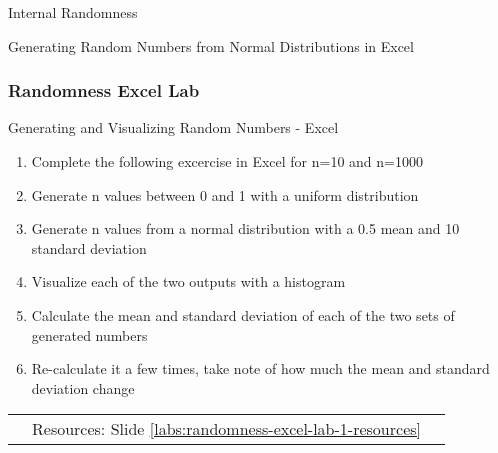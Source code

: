\documentclass[handout, 11pt]{beamer}
\begin{document}
\begin{section}{Internal Randomness}
\begin{frame}
{\begin{block}{Generating Random Numbers from Normal Distributions in Excel}
\end{block}
}
\end{frame}
\begin{frame}
\frametitle{Randomness Excel Lab}
{
\begin{block}{Generating and Visualizing Random Numbers - Excel}
\begin{enumerate}
\item Complete the following excercise in Excel for n=10 and n=1000
\item Generate n values between 0 and 1 with a uniform distribution
\item Generate n values from a normal distribution with a 0.5 mean and 10 standard deviation
\item Visualize each of the two outputs with a histogram
\item Calculate the mean and standard deviation of each of the two sets of generated numbers
\item Re-calculate it a few times, take note of how much the mean and standard deviation change
\end{enumerate}
\vfill
\begin{tabular*}{\textwidth}{@{\extracolsep{\fill}}ccc}
\toprule
\hfill & Resources: Slide \textcolor{blue}{\underline{\ref{labs:randomness-excel-lab-1-resources}}} & \hfill\\


\end{tabular*}
\end{block}}
\end{frame}
\end{section}
\end{document}
